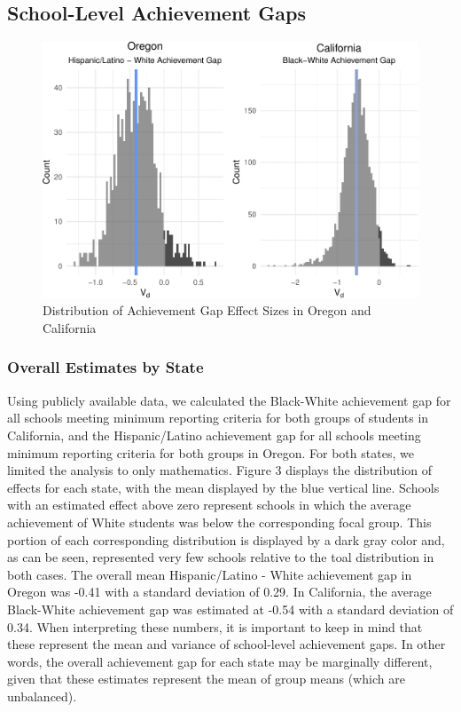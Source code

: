 \documentclass[man, fleqn, noextraspace]{apa6}
\theoremstyle{definition}
\theoremstyle{definition}
\theoremstyle{definition}
\theoremstyle{remark}
\begin{document}
\hypertarget{school-level-achievement-gaps}{%
\subsection{School-Level Achievement
Gaps}\label{school-level-achievement-gaps}}

\begin{figure}
\centering
\includegraphics{anderson_ncme18_files/figure-latex/unnamed-chunk-3-1.pdf}
\caption{\label{fig:unnamed-chunk-3}Distribution of Achievement Gap Effect
Sizes in Oregon and California}
\end{figure}

\hypertarget{overall-estimates-by-state}{%
\subsubsection{Overall Estimates by
State}\label{overall-estimates-by-state}}

Using publicly available data, we calculated the Black-White achievement
gap for all schools meeting minimum reporting criteria for both groups
of students in California, and the Hispanic/Latino achievement gap for
all schools meeting minimum reporting criteria for both groups in
Oregon. For both states, we limited the analysis to only mathematics.
Figure 3 displays the distribution of effects for each state, with the
mean displayed by the blue vertical line. Schools with an estimated
effect above zero represent schools in which the average achievement of
White students was below the corresponding focal group. This portion of
each corresponding distribution is displayed by a dark gray color and,
as can be seen, represented very few schools relative to the toal
distribution in both cases. The overall mean Hispanic/Latino - White
achievement gap in Oregon was -0.41 with a standard deviation of 0.29.
In California, the average Black-White achievement gap was estimated at
-0.54 with a standard deviation of 0.34. When interpreting these
numbers, it is important to keep in mind that these represent the mean
and variance of school-level achievement gaps. In other words, the
overall achievement gap for each state may be marginally different,
given that these estimates represent the mean of group means (which are
unbalanced).
\end{document}
